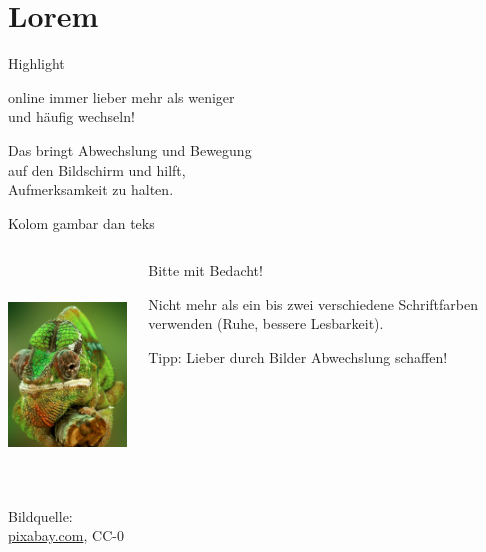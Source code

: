 \documentclass[main.tex]{subfiles}
\begin{document}
\section{Lorem}

\begin{frame}{Highlight}
	\begin{center}
		\Large
		online immer lieber {\Huge mehr} als weniger\\
		und häufig wechseln!
	\end{center}
	\pause
	\begin{center}
		\Large
		Das bringt Abwechslung und Bewegung\\auf
		den Bildschirm und hilft,\\
		{\Huge Aufmerksamkeit} zu {\Huge halten}.
	\end{center}
\end{frame}

\begin{frame}{Kolom gambar dan teks}
	\begin{columns}
		\begin{column}{5cm}
			\begin{center}
				\includegraphics[height=6cm]{figures/chamaeleon_hochformat}

				{\tiny \textcolor{digiPH_darkorange}{Bildquelle: \url{pixabay.com}, CC-0}}
			\end{center}
		\end{column}
		\begin{column}{5cm}
			\begin{center}
				\Large
				Bitte mit Bedacht!
			\end{center}
			\pause
			\begin{center}
				Nicht mehr als ein bis zwei verschiedene Schriftfarben verwenden (Ruhe, bessere Lesbarkeit).
			\end{center}
			\begin{center}
				Tipp: Lieber durch Bilder Abwechslung schaffen!
			\end{center}
		\end{column}
	\end{columns}
\end{frame}
\end{document}
